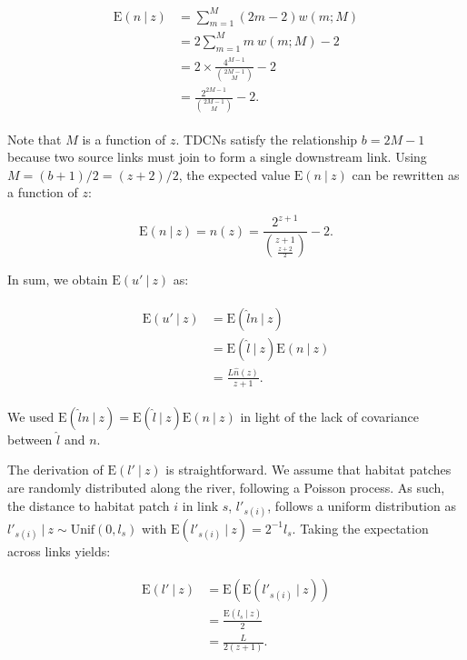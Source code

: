 \documentclass[11pt, class=article, crop=false]{standalone}
\begin{document}
\begin{align}
    \begin{split}
    \mbox{E}(n~|~z) &= \sum_{m=1}^{M} (2m - 2) w(m; M)\\
                    &= 2 \sum_{m=1}^{M} m~w(m; M) - 2\\
                    &= 2 \times \frac{4^{M-1}}{\binom{2M-1}{M}} - 2\\
                    &= \frac{2^{2M-1}}{\binom{2M-1}{M}} - 2.
    \end{split}
    \label{eq:n-hat}
\end{align}

Note that $M$ is a function of $z$.
TDCNs satisfy the relationship $b = 2M - 1$ because two source links must join to form a single downstream link.
Using $M = (b + 1) / 2 = (z + 2) / 2$, the expected value $\mbox{E}(n~|~z)$ can be rewritten as a function of $z$:

\begin{equation}
    \mbox{E}(n~|~z) = \hat{n}(z) = 
    \frac{2^{z + 1}}{\binom{z + 1}{\frac{z + 2}{2}}} - 2.
\end{equation}

In sum, we obtain $\mbox{E}(u' ~|~ z)$ as:

\begin{align}
    \begin{split}
        \mbox{E}(u' ~|~ z) &= \mbox{E}(\hat{l}n ~|~ z)\\
                           &= \mbox{E}(\hat{l} ~|~ z)\mbox{E}(n ~|~ z)\\
                           &= \frac{L \hat{n}(z)}{z + 1}.
    \end{split}
\end{align}

We used $\mbox{E}(\hat{l}n ~|~ z) = \mbox{E}(\hat{l} ~|~ z)\mbox{E}(n ~|~ z)$ in light of the lack of covariance between $\hat{l}$ and $n$.

The derivation of $\mbox{E}(l'~|~z)$ is straightforward.
We assume that habitat patches are randomly distributed along the river, following a Poisson process.
As such, the distance to habitat patch $i$ in link $s$, $l'_{s(i)}$, follows a uniform distribution as $l'_{s(i)}~|~z \sim \mbox{Unif}(0, l_s)$ with $\mbox{E}(l'_{s(i)}~|~z) = 2^{-1} l_s$.
Taking the expectation across links yields:

\begin{align}
    \begin{split}
        \mbox{E}(l'~|~z) &= \mbox{E}(\mbox{E}(l'_{s(i)}~|~z))\\
                     &= \frac{\mbox{E}(l_s~|~z)}{2}\\
                     &= \frac{L}{2(z + 1)}.
    \end{split}
\end{align}
\end{document}
